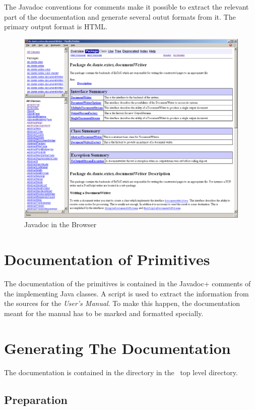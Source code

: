 The Javadoc conventions for comments make it possible to extract the
relevant part of the documentation and generate several outut formats
from it. The primary output format is HTML.
\begin{figure}[tbh]
  \centering
  \includegraphics[scale=.33]{image/javadoc}
  \caption{Javadoc in the Browser}\label{fig:eclipse-javadoc}
\end{figure}


\section{Documentation of Primitives}

The documentation of the primitives is contained in the \+Javadoc+
comments of the implementing Java classes. A script is used to extract
the information from the sources for the \textit{User's Manual}. To
make this happen, the documentation meant for the manual has to be
marked and formatted specially.

\INCOMPLETE


\section{Generating The Documentation}

The documentation is contained in the directory  in the
\ExTeX\ top level directory.

\subsection{Preparation}

